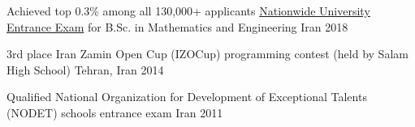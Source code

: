 
\begin{cvhonors}

  \cvhonor
    {Achieved top 0.3\% among all 130,000+ applicants} %
    {\href{https://en.wikipedia.org/wiki/Iranian_University_Entrance_Exam}{Nationwide University Entrance Exam} for B.Sc. in Mathematics and Engineering} %
    {Iran} %
    {2018} %

  \cvhonor
    {3rd place} %
    {Iran Zamin Open Cup (IZOCup) programming contest (held by Salam High School)} %
    {Tehran, Iran} %
    {2014} %

  \cvhonor
    {Qualified} %
    {National Organization for Development of Exceptional Talents (NODET) schools entrance exam} %
    {Iran} %
    {2011} %

\end{cvhonors}
